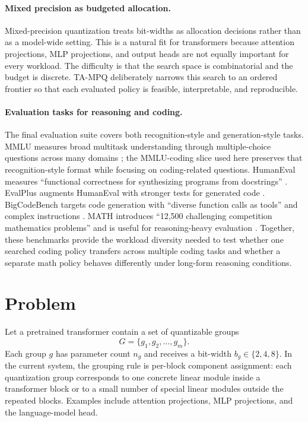 \documentclass{article}
\newcommand{\method}{TA-MPQ}
\begin{document}
\paragraph{Mixed precision as budgeted allocation.}
Mixed-precision quantization treats bit-widths as allocation decisions rather than as a model-wide setting. This is a natural fit for transformers because attention projections, MLP projections, and output heads are not equally important for every workload. The difficulty is that the search space is combinatorial and the budget is discrete. \method{} deliberately narrows this search to an ordered frontier so that each evaluated policy is feasible, interpretable, and reproducible.

\paragraph{Evaluation tasks for reasoning and coding.}
The final evaluation suite covers both recognition-style and generation-style tasks. MMLU measures broad multitask understanding through multiple-choice questions across many domains \cite{hendrycks2021mmlu}; the MMLU-coding slice used here preserves that recognition-style format while focusing on coding-related questions. HumanEval measures ``functional correctness for synthesizing programs from docstrings'' \cite{chen2021codex}. EvalPlus augments HumanEval with stronger tests for generated code \cite{liu2023evalplus}. BigCodeBench targets code generation with ``diverse function calls as tools'' and complex instructions \cite{zhuo2025bigcodebench}. MATH introduces ``12,500 challenging competition mathematics problems'' and is useful for reasoning-heavy evaluation \cite{hendrycks2021math}. Together, these benchmarks provide the workload diversity needed to test whether one searched coding policy transfers across multiple coding tasks and whether a separate math policy behaves differently under long-form reasoning conditions.

\section{Problem}

Let a pretrained transformer contain a set of quantizable groups
\[
G = \{g_1, g_2, \ldots, g_m\}.
\]
Each group $g$ has parameter count $n_g$ and receives a bit-width $b_g \in \{2,4,8\}$. In the current system, the grouping rule is per-block component assignment: each quantization group corresponds to one concrete linear module inside a transformer block or to a small number of special linear modules outside the repeated blocks. Examples include attention projections, MLP projections, and the language-model head.
\end{document}

